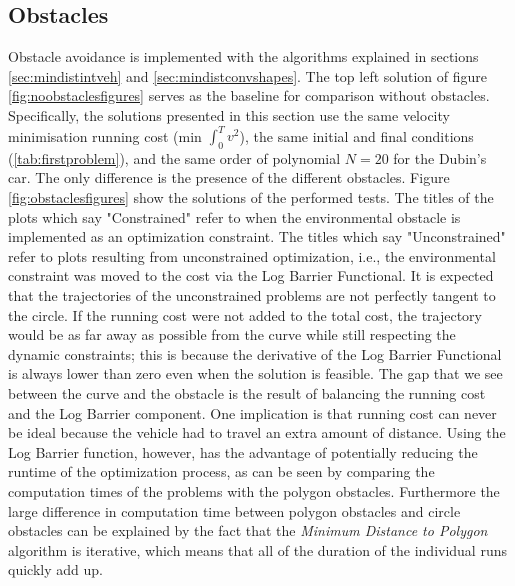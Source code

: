 \subsection{Obstacles}

\par Obstacle avoidance is implemented with the algorithms explained in sections \ref{sec:mindistintveh} and \ref{sec:mindistconvshapes}. The top left solution of figure \ref{fig:noobstaclesfigures} serves as the baseline for comparison without obstacles. Specifically, the solutions presented in this section use the same velocity minimisation running cost (min $\int_0^T v^2$), the same initial and final conditions (\ref{tab:firstproblem}), and the same order of polynomial $N=20$ for the Dubin's car. The only difference is the presence of the different obstacles. Figure \ref{fig:obstaclesfigures} show the solutions of the performed tests. The titles of the plots which say "Constrained" refer to when the environmental obstacle is implemented as an optimization constraint. The titles which say "Unconstrained" refer to plots resulting from unconstrained optimization, i.e., the environmental constraint was moved to the cost via the Log Barrier Functional. It is expected that the trajectories of the unconstrained problems are not perfectly tangent to the circle. If the running cost were not added to the total cost, the trajectory would be as far away as possible from the curve while still respecting the dynamic constraints; this is because the derivative of the Log Barrier Functional is always lower than zero even when the solution is feasible. The gap that we see between the curve and the obstacle is the result of balancing the running cost and the Log Barrier component. One implication is that running cost can never be ideal because the vehicle had to travel an extra amount of distance. Using the Log Barrier function, however, has the advantage of potentially reducing the runtime of the optimization process, as can be seen by comparing the computation times of the problems with the polygon obstacles. Furthermore the large difference in computation time between polygon obstacles and circle obstacles can be explained by the fact that the \textit{Minimum Distance to Polygon} algorithm is iterative, which means that all of the duration of the individual runs quickly add up.


